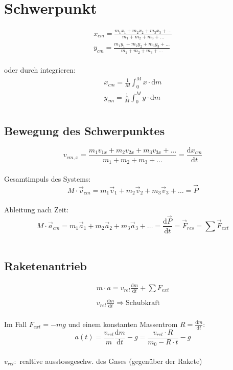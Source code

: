 



\chapter{Schwerpunkt}
\[\boxed{\begin{split}
	x_{cm}=\frac{m_1x_1+m_2x_2+m_3x_3+\ldots}{m_1+m_2+m_3+\ldots}\\
	y_{cm}=\frac{m_1y_1+m_2y_2+m_3y_3+\ldots}{m_1+m_2+m_3+\ldots}
\end{split}}\]\\
oder durch integrieren:
\[
	\boxed{\begin{split}
		x_{cm}=\frac{1}{M}\int_0^M{x\cdot\mathrm{d}m}\\
		y_{cm}=\frac{1}{M}\int_0^M{y\cdot\mathrm{d}m}\\
	\end{split}}
\]

\section{Bewegung des Schwerpunktes}
\[
	\boxed{
		v_{cm,x}=\frac{m_1v_{1x}+m_2v_{2x}+m_3v_{3x}+\ldots}{m_1+m_2+m_3+\ldots}=\frac{\mathrm{d}x_{cm}}{\mathrm{d}t}
	}
\]\\
Gesamtimpuls des Systems:
\[
	\boxed{
		M\cdot\vec{v}_{cm}=m_1\vec{v}_1+m_2\vec{v}_2+m_3\vec{v}_3+\ldots=\vec{P}
	}
\]\\
Ableitung nach Zeit:
\[
	\boxed{
		M\cdot\vec{a}_{cm}=m_1\vec{a}_1+m_2\vec{a}_2+m_3\vec{a}_3+\ldots=\frac{\mathrm{d}\vec{P}}{\mathrm{d}t}=\vec{F}_{res}=\sum\vec{F}_{ext}
	}
\]\\

\section{Raketenantrieb}
\[\boxed{\begin{split}
	m\cdot a=v_{rel}\frac{\mathrm{d}m}{\mathrm{d}t}+\sum{F_{ext}}\\
	\\
	v_{rel}\frac{\mathrm{d}m}{\mathrm{d}t} \Rightarrow \mathrm{Schubkraft}
\end{split}}\]\\
Im Fall $F_{ext}=-mg$ und einem konstanten Massentrom $R=\frac{\mathrm{d}m}{\mathrm{d}t}$:
\[
	\boxed{
		a(t)=\frac{v_{rel}}{m}\frac{\mathrm{d}m}{\mathrm{d}t}-g=\frac{v_{rel}\cdot R}{m_0-R\cdot t}-g
	}
\]\\
$v_{rel}:$ realtive ausstossgeschw. des Gases (gegen\"uber der Rakete)
